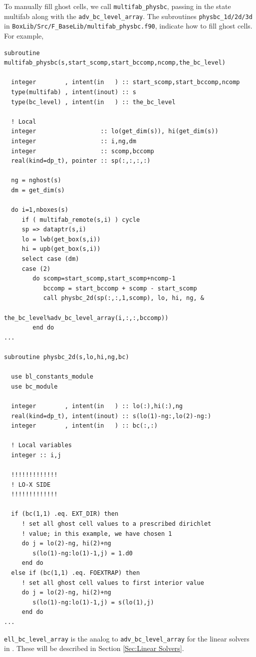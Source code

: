 To manually fill ghost cells, we call {\tt multifab\_physbc}, passing in the state multifab
along with the {\tt adv\_bc\_level\_array}.  The subroutines {\tt physbc\_1d/2d/3d} in
{\tt BoxLib/Src/F\_BaseLib/multifab\_physbc.f90}, indicate how to fill ghost cells.  For example,
\begin{lstlisting}[backgroundcolor=\color{light-green}]
subroutine multifab_physbc(s,start_scomp,start_bccomp,ncomp,the_bc_level)

  integer        , intent(in   ) :: start_scomp,start_bccomp,ncomp
  type(multifab) , intent(inout) :: s
  type(bc_level) , intent(in   ) :: the_bc_level

  ! Local
  integer                  :: lo(get_dim(s)), hi(get_dim(s))
  integer                  :: i,ng,dm
  integer                  :: scomp,bccomp
  real(kind=dp_t), pointer :: sp(:,:,:,:)
    
  ng = nghost(s)
  dm = get_dim(s)
    
  do i=1,nboxes(s)
     if ( multifab_remote(s,i) ) cycle
     sp => dataptr(s,i)
     lo = lwb(get_box(s,i))
     hi = upb(get_box(s,i))
     select case (dm)
     case (2)
        do scomp=start_scomp,start_scomp+ncomp-1
           bccomp = start_bccomp + scomp - start_scomp
           call physbc_2d(sp(:,:,1,scomp), lo, hi, ng, &
                          the_bc_level%adv_bc_level_array(i,:,:,bccomp))
        end do
...

subroutine physbc_2d(s,lo,hi,ng,bc)

  use bl_constants_module
  use bc_module

  integer        , intent(in   ) :: lo(:),hi(:),ng
  real(kind=dp_t), intent(inout) :: s(lo(1)-ng:,lo(2)-ng:)
  integer        , intent(in   ) :: bc(:,:)

  ! Local variables
  integer :: i,j

  !!!!!!!!!!!!!
  ! LO-X SIDE
  !!!!!!!!!!!!!

  if (bc(1,1) .eq. EXT_DIR) then
     ! set all ghost cell values to a prescribed dirichlet
     ! value; in this example, we have chosen 1
     do j = lo(2)-ng, hi(2)+ng
        s(lo(1)-ng:lo(1)-1,j) = 1.d0
     end do
  else if (bc(1,1) .eq. FOEXTRAP) then
     ! set all ghost cell values to first interior value
     do j = lo(2)-ng, hi(2)+ng
        s(lo(1)-ng:lo(1)-1,j) = s(lo(1),j)
     end do
...
\end{lstlisting}

{\tt ell\_bc\_level\_array} is the analog to {\tt adv\_bc\_level\_array} for the linear solvers in
\BoxLib.  These will be described in Section \ref{Sec:Linear Solvers}.


